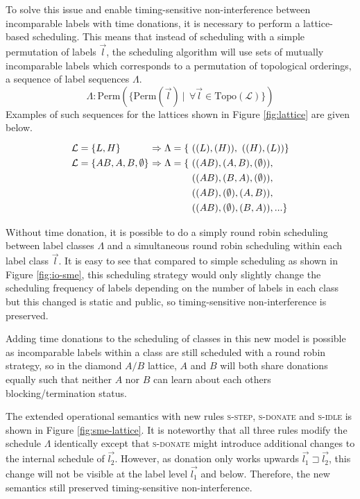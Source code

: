 \documentclass[10pt,preprint]{sigplanconf}
\newcommand{\arrayStretch}{1.28}
\begin{document}
To solve this issue and enable timing-sensitive non-interference between incomparable labels with time donations, it is necessary to perform a lattice-based scheduling.  This means that instead of scheduling with a simple permutation of labels $\vec{l}$, the scheduling algorithm will use sets of mutually incomparable labels which corresponds to a permutation of topological orderings, a sequence of label sequences $\Lambda$.
\[ \Lambda : \text{Perm}(\{ \text{Perm}(\vec{l}) ~|~~\forall \vec{l} \in \text{Topo}(\mathcal{L}) \}) \]
Examples of such sequences for the lattices shown in Figure \ref{fig:lattice} are given below.
\[\arraycolsep=1.6pt\def\arraystretch{\arrayStretch}
\begin{array}{lll}
  \mathcal{L} = \{ L, H \} & \Rightarrow \Lambda = \{ & ((L), (H)),~((H), (L))\} \\
  \mathcal{L} = \{ AB, A, B, \emptyset \} & \Rightarrow \Lambda = \{ & ((AB), (A, B), (\emptyset)), \\
                                          &                          & ((AB), (B, A), (\emptyset)), \\
                                          &                          & ((AB), (\emptyset), (A, B)), \\
                                          &                          & ((AB), (\emptyset), (B, A)), ... \}
\end{array} \]

Without time donation, it is possible to do a simply round robin scheduling between label classes $\Lambda$ and a simultaneous round robin scheduling within each label class $\vec{l}$.  It is easy to see that compared to simple scheduling as shown in Figure \ref{fig:io-sme}, this scheduling strategy would only slightly change the scheduling frequency of labels depending on the number of labels in each class but this changed is static and public, so timing-sensitive non-interference is preserved.

Adding time donations to the scheduling of classes in this new model is possible as incomparable labels within a class are still scheduled with a round robin strategy, so in the diamond $A/B$ lattice, $A$ and $B$ will both share donations equally such that neither $A$ nor $B$ can learn about each others blocking/termination status.

The extended operational semantics with new rules \textsc{s-step}, \textsc{s-donate} and \textsc{s-idle} is shown in Figure \ref{fig:sme-lattice}.  It is noteworthy that all three rules modify the schedule $\Lambda$ identically except that \textsc{s-donate} might introduce additional changes to the internal schedule of $\vec{l_2}$.  However, as donation only works upwards $\vec{l_1} \sqsupset \vec{l_2}$, this change will not be visible at the label level $\vec{l_1}$ and below.  Therefore, the new semantics still preserved timing-sensitive non-interference.
\end{document}

